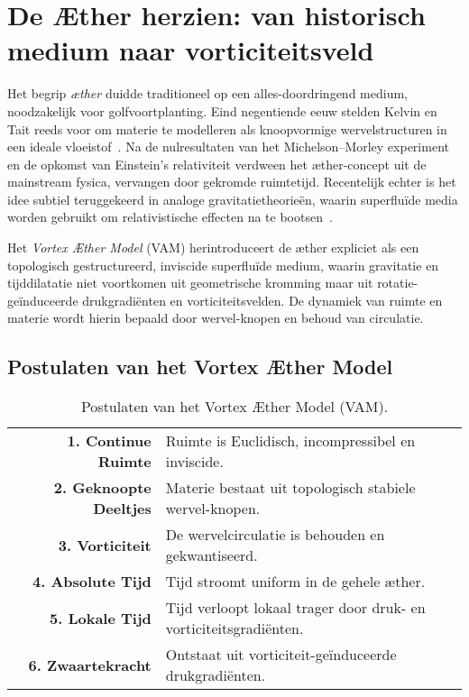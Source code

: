\section*{De Æther herzien: van historisch medium naar vorticiteitsveld}

Het begrip \textit{æther} duidde traditioneel op een alles-doordringend medium, noodzakelijk voor golfvoortplanting. Eind negentiende eeuw stelden Kelvin en Tait reeds voor om materie te modelleren als knoopvormige wervelstructuren in een ideale vloeistof~\cite{thomson1867treatise}. Na de nulresultaten van het Michelson--Morley experiment en de opkomst van Einstein's relativiteit verdween het æther-concept uit de mainstream fysica, vervangen door gekromde ruimtetijd. Recentelijk echter is het idee subtiel teruggekeerd in analoge gravitatietheorieën, waarin superfluïde media worden gebruikt om relativistische effecten na te bootsen~\cite{barcelo2011analogue,volovik2009universe}.

Het \textit{Vortex Æther Model} (VAM) herintroduceert de æther expliciet als een topologisch gestructureerd, inviscide superfluïde medium, waarin gravitatie en tijddilatatie niet voortkomen uit geometrische kromming maar uit rotatie-geïnduceerde drukgradiënten en vorticiteitsvelden. De dynamiek van ruimte en materie wordt hierin bepaald door wervel-knopen en behoud van circulatie.

\subsection*{Postulaten van het Vortex Æther Model}

\begin{table}[h!]
    \centering
    \begin{tabular}{rl}
        \midrule
        \hline
        \textbf{1. Continue Ruimte} & Ruimte is Euclidisch, incompressibel en inviscide. \\
        \textbf{2. Geknoopte Deeltjes} & Materie bestaat uit topologisch stabiele wervel-knopen. \\
        \textbf{3. Vorticiteit} & De wervelcirculatie is behouden en gekwantiseerd. \\
        \textbf{4. Absolute Tijd} & Tijd stroomt uniform in de gehele æther. \\
        \textbf{5. Lokale Tijd} & Tijd verloopt lokaal trager door druk- en vorticiteitsgradiënten. \\
        \textbf{6. Zwaartekracht} & Ontstaat uit vorticiteit-geïnduceerde drukgradiënten. \\
        \hline
        \bottomrule
    \end{tabular}
    \caption{Postulaten van het Vortex Æther Model (VAM).}
    \label{tab:postulaten}
\end{table}

